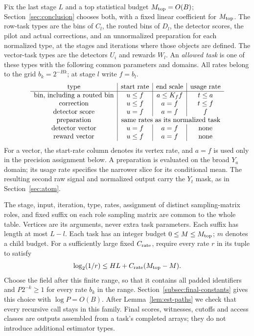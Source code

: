 Fix the last stage $L$ and a top statistical budget $M_{\rm top}=O(B)$;
Section~\ref{sec:conclusion} chooses both, with a fixed linear
coefficient for $M_{\rm top}$.
The row-task types are the bins of $C_l$, the routed bins of $D_l$,
the detector scores, the pilot and actual corrections, and an
unnormalized preparation for each normalized type, at the stages and
iterations where those objects are defined.  The vector-task types are
the detectors $U_i$ and rewards $W_l$.  An \emph{allowed task} is one of
these types with the following common parameters and domains.
All rates belong to the grid $b_k=2^{-Hk}$; at stage $l$ write $f=b_l$.
\[
\begin{array}{c|c|c|c}
 \text{type}&\text{start rate}&\text{end scale}&\text{usage rate}\\ \hline
 \text{bin, including a routed bin}&u\le f&a\le K_f f&t\le a\\
 \text{correction}&u\le f&a=f&t\le f\\
 \text{detector score}&u=f&a=f&f\\
 \text{preparation}&\multicolumn{3}{c}{\text{same rates as its normalized task}}\\
 \text{detector vector}&u=f&a=f&\text{none}\\
 \text{reward vector}&u\le f&a=f&\text{none}
\end{array}
\]
For a vector, the start-rate column denotes its vertex rate, and $a=f$
is used only in the precision assignment below.
A preparation is evaluated on the broad $Y_a$ domain; its usage rate
specifies the narrower slice for its conditional mean.  The resulting
second raw signal and normalized output carry the $Y_t$ mask, as in
Section~\ref{sec:atom}.

The stage, input, iteration, type, rates, assignment of distinct sampling-matrix
roles, and fixed suffix on each role sampling matrix are common to the whole
table.  Vertices are its arguments, never extra task parameters.
Each suffix has length at most $L-l$.  Each task has an integer budget
$0\le M\le M_{\rm top}$; $m$ denotes a child budget.  For a sufficiently
large fixed $C_{\rm rate}$, require every rate $r$ in its tuple to satisfy
\begin{equation}
 \log_2(1/r)\le HL+C_{\rm rate}(M_{\rm top}-M).
 \label{eq:est-task-range}
\end{equation}
Choose the field after this finite range, so that it contains all padded
identifiers and $P2^{-k}\ge1$ for every rate $b_k$ in the range.
Section~\ref{subsec:final-constants} gives this choice with $\log P=O(B)$.
After Lemma~\ref{lem:est-paths} we check that every recursive call stays
in this family.  Final scores, witnesses, cutoffs and access classes are
outputs assembled from a task's completed arrays; they do not introduce
additional estimator types.

